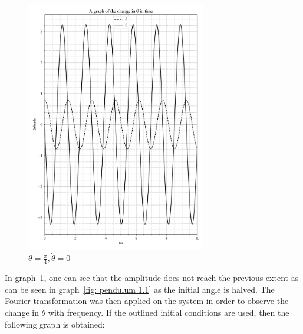 \documentclass[12pt, a4paper]{article}
\begin{document}
\begin{figure}[H]
    \centering
    \includegraphics[width = 0.7\textwidth]{plots/Plot 1.5.png}\caption{\(\theta = \frac{\pi}{4}, \dot{\theta} = 0\)}\label{fig: pendulum 1.2}
\end{figure}

In graph~\ref{fig: pendulum 1.2}, one can see that the amplitude does not reach the previous extent as can be seen in graph~\ref{fig: pendulum 1.1} as the initial angle is halved. The Fourier transformation was then  applied on the system in order to observe the change in \(\theta\) with frequency. If the outlined initial conditions are used, then the following graph is obtained:
\end{document}
